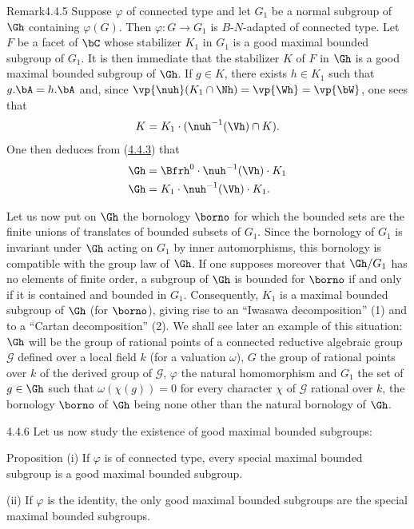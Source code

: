\documentclass[12pt,a4paper,oneside,english]{smfart}
\makeatletter
\newcommand{\btanchor}[1]{\leavevmode\Hy@raisedlink{\hypertarget{bt:#1}{}}}
\newcommand{\btref}[1]{\hyperlink{bt:#1}{#1}}
\theoremstyle{definition}
\theoremstyle{bt}
\makeatother
\begin{document}
\begin{state}{Remark}{4.4.5}\btanchor{4.4.5}
\upshape
Suppose $\varphi$ of connected type and let $G_1$ be a normal subgroup of
$\Gh$ containing $\varphi(G)$. Then $\varphi : G\to G_1$ is
$B$-$N$-adapted of connected type. Let $F$ be a facet of $\bC$ whose
stabilizer $K_1$ in $G_1$ is a good maximal bounded subgroup of $G_1$. It is
then immediate that the stabilizer $K$ of $F$ in $\Gh$ is a good maximal
bounded subgroup of $\Gh$. If $g\in K$, there exists $h\in K_1$ such that
$g.\bA = h.\bA$ and, since $\vp{\nuh}(K_1\cap\Nh) = \vp{\Wh} = \vp{\bW}$, one
sees that
\[
K = K_1\cdot(\nuh^{-1}(\Vh)\cap K).
\]
One then deduces from (\btref{4.4.3}) that
\begin{align}
\Gh &= \Bfrh^{0}\cdot\nuh^{-1}(\Vh)\cdot K_1\\
\Gh &= K_1\cdot\nuh^{-1}(\Vh)\cdot K_1 .
\end{align}

Let us now put on $\Gh$ the bornology $\borno$ for which the bounded sets are
the finite unions of translates of bounded subsets of $G_1$. Since the
bornology of $G_1$ is invariant under $\Gh$ acting on $G_1$ by inner
automorphisms, this bornology is compatible with the group law of $\Gh$. If
one supposes moreover that $\Gh/G_1$ has no elements of finite order, a
subgroup of $\Gh$ is bounded for $\borno$ if and only if it is contained and
bounded in $G_1$. Consequently, $K_1$ is a maximal bounded subgroup of $\Gh$
(for $\borno$), giving rise to an ``Iwasawa decomposition'' (1) and to a
``Cartan decomposition'' (2). We shall see later an example of this
situation: $\Gh$ will be the group of rational points of a connected
reductive algebraic group $\mathscr{G}$ defined over a local field $k$ (for a
valuation $\omega$), $G$ the group of rational points over $k$ of the derived
group of $\mathscr{G}$, $\varphi$ the natural homomorphism and $G_1$ the set
of $g\in\Gh$ such that $\omega(\chi(g)) = 0$ for every character $\chi$ of
$\mathscr{G}$ rational over $k$, the bornology $\borno$ of $\Gh$ being none
other than the natural bornology of $\Gh$.
\end{state}

\num{4.4.6}\btanchor{4.4.6}
Let us now study the existence of good maximal bounded subgroups:

\begin{states}{Proposition}
(i) If $\varphi$ is of connected type, every special maximal bounded subgroup
is a good maximal bounded subgroup.

(ii) If $\varphi$ is the identity, the only good maximal bounded subgroups
are the special maximal bounded subgroups.
\end{states}
\end{document}
